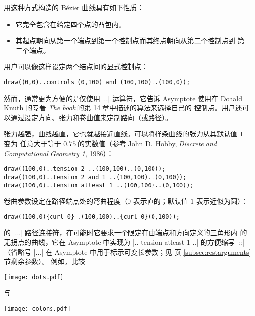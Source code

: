 \documentclass[nofonts,CJKnormalspaces]{ctexbook}[2009/05/20]
\newcommand*\prgname[1]{\textsf{#1}}
\begin{document}
用这种方式构造的 Bézier 曲线具有如下性质：
\begin{itemize}
  \item 它完全包含在给定四个点的凸包内。
  \item 其起点朝向从第一个端点到第一个控制点而其终点朝向从第二个控制点到
    第二个端点。
\end{itemize}

用户可以像这样设定两个结点间的显式控制点：
\begin{lstlisting}
draw((0,0)..controls (0,100) and (100,100)..(100,0));
\end{lstlisting}

然而，通常更为方便的是仅使用 |..| 运算符，它告诉 \prgname{Asymptote} 使用在
Donald Knuth 的专著 \textit{The \MF{}book} 的第 14 章中描述的算法来选择自己的
控制点。用户还可以通过设定方向、张力和卷曲值来定制路向（或路径）。

张力越强，曲线越直，它也就越接近直线。可以将样条曲线的张力从其默认值 $1$ 变为
任意大于等于 $0.75$ 的实数值（参考 John D.~Hobby, \textit{Discrete and
Computational Geometry 1}, 1986）：
\begin{lstlisting}
draw((100,0)..tension 2 ..(100,100)..(0,100));
draw((100,0)..tension 2 and 1 ..(100,100)..(0,100));
draw((100,0)..tension atleast 1 ..(100,100)..(0,100));
\end{lstlisting}

卷曲参数设定在路径端点处的弯曲程度（$0$ 表示直的；默认值 $1$ 表示近似为圆）：
\begin{lstlisting}
draw((100,0){curl 0}..(100,100)..{curl 0}(0,100));
\end{lstlisting}

\MP{} 的 |...| 路径连接符，在可能时它要求一个限定在由端点和方向定义的三角形内
的无拐点的曲线，它在 \prgname{Asymptote} 中实现为 |.. tension atleast 1 ..|
的方便缩写 |::|（省略号 |...| 在 \prgname{Asymptote} 中用于标示可变长参数；见
\pageref{subsec:restarguments} 页 \ref{subsec:restarguments} 节剩余参数）。
例如，比较

\begin{center}
  \texttt{[image: dots.pdf]}
\end{center}
与

\begin{center}
  \texttt{[image: colons.pdf]}
\end{center}
\end{document}
